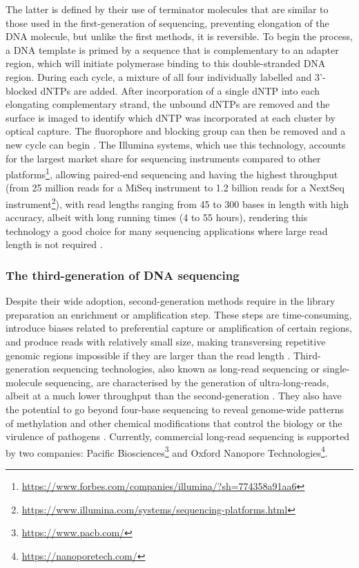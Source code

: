 The latter is defined by their use of terminator molecules that are similar to those used in the first-generation of sequencing, preventing elongation of the DNA molecule, but unlike the first methods, it is reversible. 
To begin the process, a DNA template is primed by a sequence that is complementary to an adapter region, which will initiate polymerase binding to this double-stranded DNA region. 
During each cycle, a mixture of all four individually labelled and 3'-blocked \ac{dNTP}s are added. 
After incorporation of a single \ac{dNTP} into each elongating complementary strand, the unbound \ac{dNTP}s are removed and the surface is imaged to identify which \ac{dNTP} was incorporated at each cluster by optical capture. 
The fluorophore and blocking group can then be removed and a new cycle can begin \citep{goodwin_coming_2016}. 
The Illumina systems, which use this technology, accounts for the largest market share for sequencing instruments compared to other platforms\footnote{\url{https://www.forbes.com/companies/illumina/?sh=774358a91aa6}}, allowing paired-end sequencing and having the highest throughput (from 25 million reads for a MiSeq instrument to  1.2 billion reads for a NextSeq instrument\footnote{\url{https://www.illumina.com/systems/sequencing-platforms.html}}), with read lengths ranging from 45 to 300 bases in length with high accuracy, albeit with long running times (4 to 55 hours), rendering this technology a good choice for many sequencing applications where large read length is not required \citep{loman_performance_2012, gupta_chapter_2014, hagemann_overview_2015}.

\subsubsection{The third-generation of DNA sequencing} \label{ssec:_intro_3rd_gen_seq}

Despite their wide adoption, second-generation methods require in the library preparation an enrichment or amplification step. 
These steps are time-consuming, introduce biases related to preferential capture or amplification of certain regions, and produce reads with relatively small size, making transversing repetitive genomic regions impossible if they are larger than the read length \citep{hagemann_overview_2015}. 
Third-generation sequencing technologies, also known as long-read sequencing or single-molecule sequencing, are characterised by the generation of ultra-long-reads, albeit at a much lower throughput than the second-generation \citep{hoang_long-reads-based_2022}. 
They also have the potential to go beyond four-base sequencing to reveal genome-wide patterns of methylation and other chemical modifications that control the biology or the virulence of pathogens \citep{korlach_going_2012}. 
Currently, commercial long-read sequencing is supported by two companies: Pacific Biosciences\footnote{\url{https://www.pacb.com/}} and Oxford Nanopore Technologies\footnote{\url{https://nanoporetech.com/}}. 

